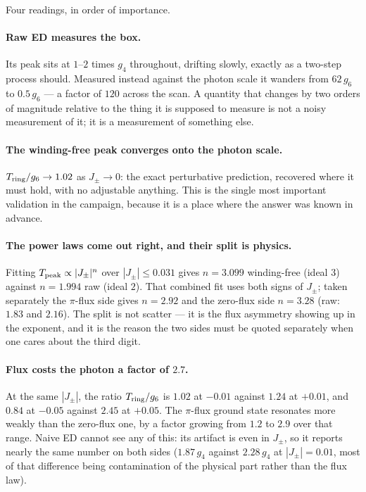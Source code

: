 \documentclass[11pt,a4paper]{article}
\newcommand{\Jpm}{J_{\pm}}
\newcommand{\gfour}{g_4}
\newcommand{\gsix}{g_6}
\begin{document}
Four readings, in order of importance.

\paragraph{Raw ED measures the box.}  Its peak sits at $1$--$2$ times
$\gfour$ throughout, drifting slowly, exactly as a two-step process should.
Measured instead against the photon scale it wanders from $62\,\gsix$ to
$0.5\,\gsix$ --- a factor of $120$ across the scan.  A quantity that changes
by two orders of magnitude relative to the thing it is supposed to measure
is not a noisy measurement of it; it is a measurement of something else.

\paragraph{The winding-free peak converges onto the photon scale.}
$T_{\rm ring}/\gsix\to1.02$ as $\Jpm\to0$: the exact perturbative
prediction, recovered where it must hold, with no adjustable anything.  This
is the single most important validation in the campaign, because it is a
place where the answer was known in advance.

\paragraph{The power laws come out right, and their split is physics.}
Fitting $T_{\rm peak}\propto|\Jpm|^{n}$ over $|\Jpm|\le0.031$ gives
$n=3.099$ winding-free (ideal $3$) against $n=1.994$ raw (ideal $2$).  That
combined fit uses both signs of $\Jpm$; taken separately the $\pi$-flux side
gives $n=2.92$ and the zero-flux side $n=3.28$ (raw: $1.83$ and $2.16$).
The split is not scatter --- it is the flux asymmetry showing up in the
exponent, and it is the reason the two sides must be quoted separately when
one cares about the third digit.

\paragraph{Flux costs the photon a factor of $2.7$.}  At the same
$|\Jpm|$, the ratio $T_{\rm ring}/\gsix$ is $1.02$ at $-0.01$ against $1.24$
at $+0.01$, and $0.84$ at $-0.05$ against $2.45$ at $+0.05$.  The
$\pi$-flux ground state resonates more weakly than the zero-flux one, by a
factor growing from $1.2$ to $2.9$ over that range.  Naive ED cannot see any
of this: its artifact is even in $\Jpm$, so it reports nearly the same
number on both sides ($1.87\,\gfour$ against $2.28\,\gfour$ at
$|\Jpm|=0.01$, most of that difference being contamination of the physical
part rather than the flux law).
\end{document}
